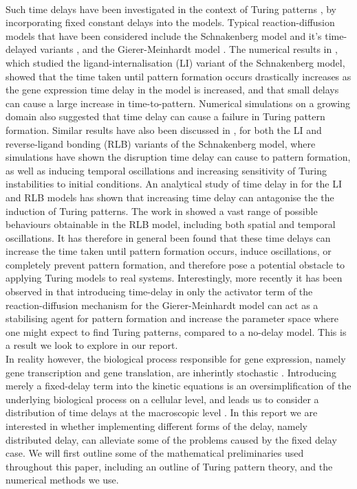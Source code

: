 \\
Such time delays have been investigated in the context of Turing patterns \cite{gaffmonk,leegaffney,yigaffneyli,jiang,leegaffmonk,bratsun,william}, by incorporating fixed constant delays into the models. Typical reaction-diffusion models that have been considered include the Schnakenberg model and it's time-delayed variants \cite{schnakenberg}, and the Gierer-Meinhardt model \cite{gm}. The numerical results in \cite{gaffmonk}, which studied the ligand-internalisation (LI) variant of the Schnakenberg model, showed that the time taken until pattern formation occurs drastically increases as the gene expression time delay in the model is increased, and that small delays can cause a large increase in time-to-pattern. Numerical simulations on a growing domain also suggested that time delay can cause a failure in Turing pattern formation. Similar results have also been discussed in \cite{leegaffney,leegaffmonk}, for both the LI and reverse-ligand bonding (RLB) variants of the Schnakenberg model, where simulations have shown the disruption time delay can cause to pattern formation, as well as inducing temporal oscillations and increasing sensitivity of Turing instabilities to initial conditions. An analytical study of time delay in \cite{yigaffneyli} for the LI and RLB models has shown that increasing time delay can antagonise the the induction of Turing patterns. The work in \cite{jiang} showed a vast range of possible behaviours obtainable in the RLB model, including both spatial and temporal oscillations. It has therefore in general been found that these time delays can increase the time taken until pattern formation occurs, induce oscillations, or completely prevent pattern formation, and therefore pose a potential obstacle to applying Turing models to real systems. Interestingly, more recently it has been observed in \cite{fadai} that introducing time-delay in only the activator term of the reaction-diffusion mechanism for the Gierer-Meinhardt model can act as a stabilising agent for pattern formation and increase the parameter space where one might expect to find Turing patterns, compared to a no-delay model. This is a result we look to explore in our report.
\\
In reality however, the biological process responsible for gene expression, namely gene transcription and gene translation, are inherintly stochastic \cite{raj,elowitz,mcadams,paulsson}. Introducing merely a fixed-delay term into the kinetic equations is an oversimplification of the underlying biological process on a cellular level, and leads us to consider a distribution of time delays at the macroscopic level \cite{bratsun,krausenew}. In this report we are interested in whether implementing different forms of the delay, namely distributed delay, can alleviate some of the problems caused by the fixed delay case. We will first outline some of the mathematical preliminaries used throughout this paper, including an outline of Turing pattern theory, and the numerical methods we use.

